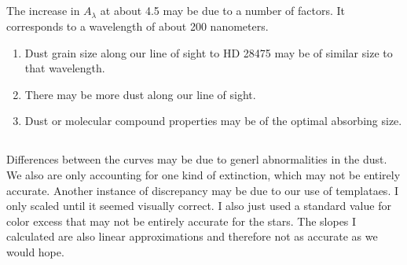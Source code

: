 \documentclass{article}
\begin{document}
    \subsection{}
    The increase in $A_\lambda$ at about 4.5 may be due to a number of factors.
    It corresponds to a wavelength of about 200 nanometers.

    \begin{enumerate}
        \item Dust grain size along our line of sight to HD 28475 may be of similar size to that wavelength.
        \item There may be more dust along our line of sight. 
        \item Dust or molecular compound properties may be of the optimal absorbing size.
    \end{enumerate}

    \subsection{}
    Differences between the curves may be due to generl abnormalities in the dust.
    We also are only accounting for one kind of extinction, which may not be entirely accurate.
    Another instance of discrepancy may be due to our use of templataes. I only scaled until it seemed visually correct.
    I also just used a standard value for color excess that may not be entirely accurate for the stars. 
    The slopes I calculated are also linear approximations and therefore not as accurate as we would hope.
\end{document}
